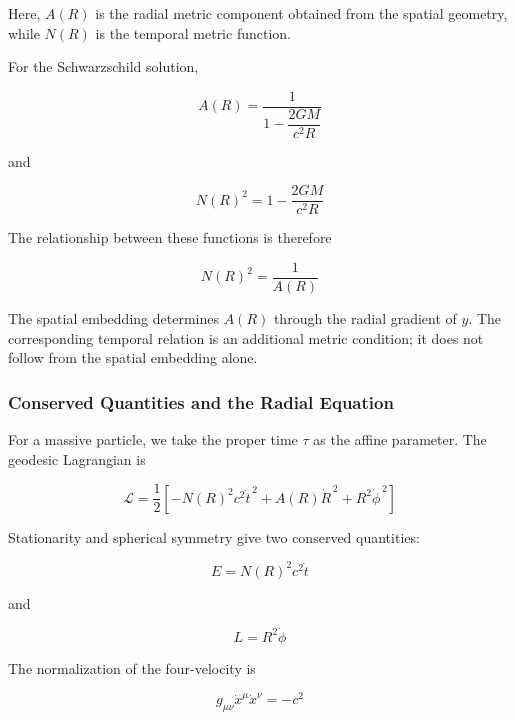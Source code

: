 \documentclass[pdflatex,sn-mathphys-num]{sn-jnl}%
\theoremstyle{thmstyleone}%
\theoremstyle{thmstyletwo}%
\theoremstyle{thmstylethree}%
\begin{document}
\begin{appendices}
Here, $A(R)$ is the radial metric component obtained from the spatial geometry, while $N(R)$ is the temporal metric function.

For the Schwarzschild solution,

\begin{equation}
    A(R)
    =
    \frac{1}{1-\dfrac{2GM}{c^2R}}
\end{equation}

and

\begin{equation}
    N(R)^2
    =
    1-\frac{2GM}{c^2R}
\end{equation}

The relationship between these functions is therefore

\begin{equation}
    \boxed{
    N(R)^2=\frac{1}{A(R)}
    }
\end{equation}

The spatial embedding determines $A(R)$ through the radial gradient of $y$. The corresponding temporal relation is an additional metric condition; it does not follow from the spatial embedding alone.

\subsubsection{Conserved Quantities and the Radial Equation}

For a massive particle, we take the proper time $\tau$ as the affine parameter. The geodesic Lagrangian is

\begin{equation}
    \mathcal{L}
    =
    \frac{1}{2}
    \left[
        -N(R)^2c^2\dot{t}^{\,2}
        +
        A(R)\dot{R}^{\,2}
        +
        R^2\dot{\phi}^{\,2}
    \right]
\end{equation}

Stationarity and spherical symmetry give two conserved quantities:

\begin{equation}
    E=N(R)^2c^2\dot{t}
\end{equation}

and

\begin{equation}
    L=R^2\dot{\phi}
\end{equation}

The normalization of the four-velocity is

\begin{equation}
    g_{\mu\nu}\dot{x}^{\mu}\dot{x}^{\nu}
    =-c^2
\end{equation}


\end{appendices}
\end{document}

